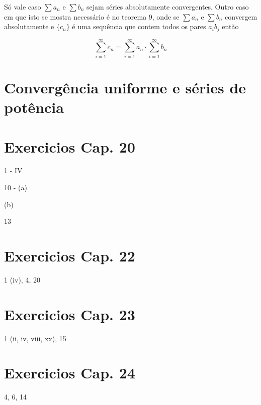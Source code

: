 \documentclass[a4paper, 12pt]{article}
\begin{document}
Só vale caso $\sum a_n$ e $\sum b_n$ sejam séries absolutamente convergentes. Outro caso em que isto
se mostra necessário é no teorema 9, onde se $\sum a_n$ e $\sum b_n$ convergem absolutamente e $\{c_n\}$
é uma sequência que contem todos os pares $a_ib_j$ então

\begin{equation}
 \nonumber \sum_{i=1}^\infty c_n = \sum_{i=1}^\infty a_n \cdot \sum_{i=1}^\infty b_n  
\end{equation}

\newpage
\section{Convergência uniforme e séries de potência}



\newpage

\section{Exercicios Cap. 20}

1 - IV

10 - (a)


(b)

13

\newpage
\section{Exercicios Cap. 22}

1 (iv), 4, 20

\newpage

\section{Exercicios Cap. 23}

1 (ii, iv, viii, xx), 15

\newpage

\section{Exercicios Cap. 24}

4, 6, 14
\end{document}

